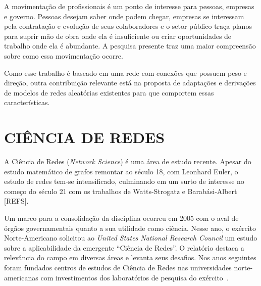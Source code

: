 \documentclass[12pt,a4paper,final]{article}
\begin{document}
A movimentação de profissionais é um ponto de interesse para pessoas, empresas e governo. Pessoas desejam saber onde podem chegar, empresas se interessam pela contratação e evolução de seus colaboradores e o setor público traça planos para suprir mão de obra onde ela é insuficiente ou criar oportunidades de trabalho onde ela é abundante. A pesquisa presente traz uma maior compreensão sobre como essa movimentação ocorre.

Como esse trabalho é baseado em uma rede com conexões que possuem peso e direção, outra contribuição relevante está na proposta de adaptações e derivações de modelos de redes aleatórias existentes para que comportem essas características.

\section{CIÊNCIA DE REDES}

A Ciência de Redes (\textit{Network Science}) é uma área de estudo recente. Apesar do estudo matemático de grafos remontar ao século 18, com Leonhard Euler, o estudo de redes tem-se intensificado, culminando em um surto de interesse no começo do século 21 com os trabalhos de Watts-Strogatz e Barabási-Albert [{REFS}].

Um marco para a consolidação da disciplina ocorreu em 2005 com o aval de órgãos governamentais quanto a sua utilidade como ciência. Nesse ano, o exército Norte-Americano solicitou ao \textit{United States National Research Council} um estudo sobre a aplicabilidade da emergente \enquote{Ciência de Redes}. O relatório destaca a relevância do campo em diversas áreas e levanta seus desafios. Nos anos seguintes foram fundados centros de estudos de Ciência de Redes nas universidades norte-americanas com investimentos dos laboratórios de pesquisa do exército~\cite{Maxwell2009-kq}.
\end{document}
